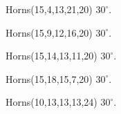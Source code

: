 \documentclass[11pt]{article}
\begin{document}
\begin{figure}[H]
\centering
{}
\caption{Horns(15,4,13,21,20) $30^\circ$.}
\end{figure}

\begin{figure}[H]
\centering
{}
\caption{Horns(15,9,12,16,20) $30^\circ$.}
\end{figure}

\begin{figure}[H]
\centering
{}
\caption{Horns(15,14,13,11,20) $30^\circ$.}
\end{figure}

\begin{figure}[H]
\centering
{}
\caption{Horns(15,18,15,7,20) $30^\circ$.}
\end{figure}

\begin{figure}[H]
\centering
{}
\caption{Horns(10,13,13,13,24) $30^\circ$.}
\end{figure}
\end{document}
